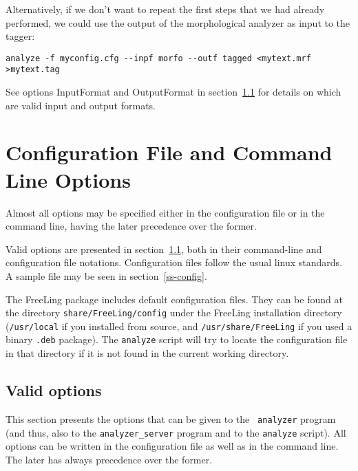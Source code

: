 \documentclass[a4paper]{book}
\begin{document}
   Alternatively, if we don't want to repeat the first steps that we
   had already performed, we could use the output of the morphological
   analyzer as input to the tagger:
\begin{verbatim}
analyze -f myconfig.cfg --inpf morfo --outf tagged <mytext.mrf >mytext.tag
\end{verbatim}
 
   See options InputFormat and OutputFormat in
   section~\ref{ss-options} for details on which are valid input and
   output formats.

\section{Configuration File and Command Line Options}

   Almost all options may be specified either in the configuration
   file or in the command line, having the later precedence over the
   former.

   Valid options are presented in section~\ref{ss-options}, both in
   their command-line and configuration file notations. Configuration
   files follow the usual linux standards. A sample file may be seen
   in section~\ref{ss-config}.

  The FreeLing package includes default configuration files. They can
  be found at the directory {\tt share/FreeLing/config} under the FreeLing
  installation directory ({\tt /usr/local}  if you installed from source, and
   \verb#/usr/share/FreeLing# if you used a binary {\tt .deb} package).
   The {\tt analyze} script will try to locate the configuration file in
  that directory if it is not found in the current working directory.


\subsection{Valid options}
\label{ss-options}

   This section presents the options that can be given to the {\tt
     analyzer} program (and thus, also to the {\tt analyzer\_server}
   program and to the {\tt analyze} script). All options can be
   written in the configuration file as well as in the command line.
   The later has always precedence over the former.
\end{document}
